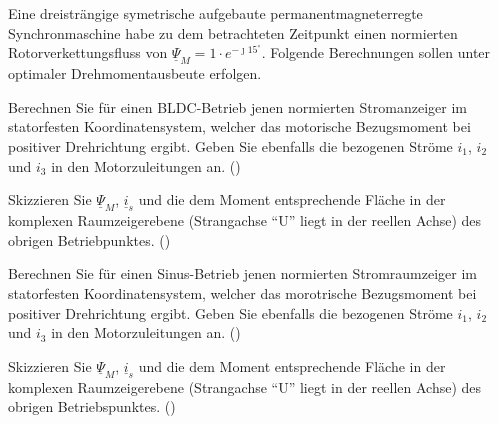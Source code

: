 \begin{question}[section=1,name={18.6.2014},mode=exm,type=bsp,tags={20140618}]
Eine dreisträngige symetrische aufgebaute permanentmagneterregte Synchronmaschine habe zu dem betrachteten Zeitpunkt einen normierten Rotorverkettungsfluss von $\underline{\Psi}_M = 1 \cdot e^{-\jmath15^\circ}$. Folgende Berechnungen sollen unter optimaler Drehmomentausbeute erfolgen.
\begin{compactenum}
\item Berechnen Sie für einen BLDC-Betrieb jenen normierten Stromanzeiger im statorfesten Koordinatensystem, welcher das motorische Bezugsmoment bei positiver Drehrichtung ergibt. Geben Sie ebenfalls die bezogenen Ströme $i_1$, $i_2$ und $i_3$ in den Motorzuleitungen an. ()
\item Skizzieren Sie $\underline{\Psi}_M$, $\underline{i}_s$ und die dem Moment entsprechende Fläche in der komplexen Raumzeigerebene (Strangachse ``U'' liegt in der reellen Achse) des obrigen Betriebpunktes. ()
\item Berechnen Sie für einen Sinus-Betrieb jenen normierten Stromraumzeiger im statorfesten Koordinatensystem, welcher das morotrische Bezugsmoment bei positiver Drehrichtung ergibt. Geben Sie ebenfalls die bezogenen Ströme $i_1$, $i_2$ und $i_3$ in den Motorzuleitungen an. ()
\item Skizzieren Sie $\underline{\Psi}_M$, $\underline{i}_s$ und die dem Moment entsprechende Fläche in der komplexen Raumzeigerebene (Strangachse ``U'' liegt in der reellen Achse) des obrigen Betriebspunktes. ()
\end{compactenum}
\end{question}
